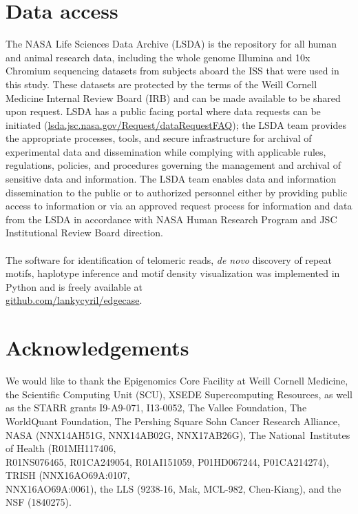 \documentclass{article}
\begin{document}
\section*{Data access} 
The NASA Life Sciences Data Archive (LSDA) is the repository for all human and animal research data, including the whole genome Illumina and 10x Chromium sequencing datasets from subjects aboard the ISS that were used in this study.
These datasets are protected by the terms of the Weill Cornell Medicine Internal Review Board (IRB) and can be made available to be shared upon request.
LSDA has a public facing portal where data requests can be initiated (\href{https://lsda.jsc.nasa.gov/Request/dataRequestFAQ}{lsda.jsc.nasa.gov/Request/dataRequestFAQ});
the LSDA team provides the appropriate processes, tools, and secure infrastructure for archival of experimental data and dissemination while complying with applicable rules, regulations, policies, and procedures governing the management and archival of sensitive data and information.
The LSDA team enables data and information dissemination to the public or to authorized personnel either by providing public access to information or via an approved request process for information and data from the LSDA in accordance with NASA Human Research Program and JSC Institutional Review Board direction.
\\~\\
The software for identification of telomeric reads, \textit{de novo} discovery of repeat motifs, haplotype inference and motif density visualization was implemented in Python and is freely available at \\%
\href{https://github.com/lankycyril/edgecase}{github.com/lankycyril/edgecase}.

\section*{Acknowledgements} 
We would like to thank
the Epigenomics Core Facility at Weill Cornell Medicine,
the Scientific Computing Unit (SCU),
XSEDE Supercomputing Resources,
as well as
the STARR grants I9-A9-071, I13-0052,
The Vallee Foundation,
The WorldQuant Foundation,
The Pershing Square Sohn Cancer Research Alliance,
NASA (NNX14AH51G, NNX14AB02G, NNX17AB26G),
The National Institutes of Health (R01MH117406, \\%
R01NS076465, R01CA249054, R01AI151059, P01HD067244, P01CA214274),
TRISH (NNX16AO69A:0107, \\%
NNX16AO69A:0061),
the LLS (9238-16, Mak, MCL-982, Chen-Kiang),
and
the NSF (1840275).
\end{document}
